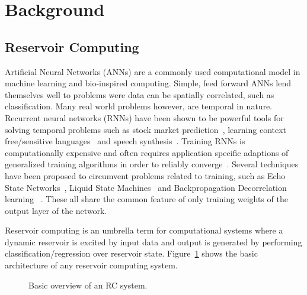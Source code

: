 \section{Background}
\label{sec:background}

\subsection{Reservoir Computing}

Artificial Neural Networks (ANNs) are a commonly used computational model in machine learning and bio-inspired computing.
Simple, feed forward ANNs lend themselves well to problems were data can be spatially correlated, such as classification.
Many real world problems however, are temporal in nature.
Recurrent neural networks (RNNs) have been shown to be powerful tools for solving temporal problems such as stock market prediction~\cite{Lawrence2001}, learning context free/sensitive languages~\cite{Gers2001} and speech synthesis~\cite{Wu2016}.
Training RNNs is computationally expensive and often requires application specific adaptions of generalized training algorithms in order to reliably converge~\cite{Hammer2002}.
Several techniques have been proposed to circumvent problems related to training, such as Echo State Networks~\cite{Jaeger2001}, Liquid State Machines~\cite{Maass2002} and Backpropagation Decorrelation learning~\cite{Steil2004} .
These all share the common feature of only training weights of the output layer of the network.

Reservoir computing is an umbrella term for computational systems where a dynamic reservoir is excited by input data and output is generated by performing classification/regression over reservoir state.
Figure~\ref{fig:rc-system} shows the basic architecture of any reservoir computing system.

\begin{figure}
  \centering
  \caption{Basic overview of an RC system.}
\label{fig:rc-system}
\end{figure}

